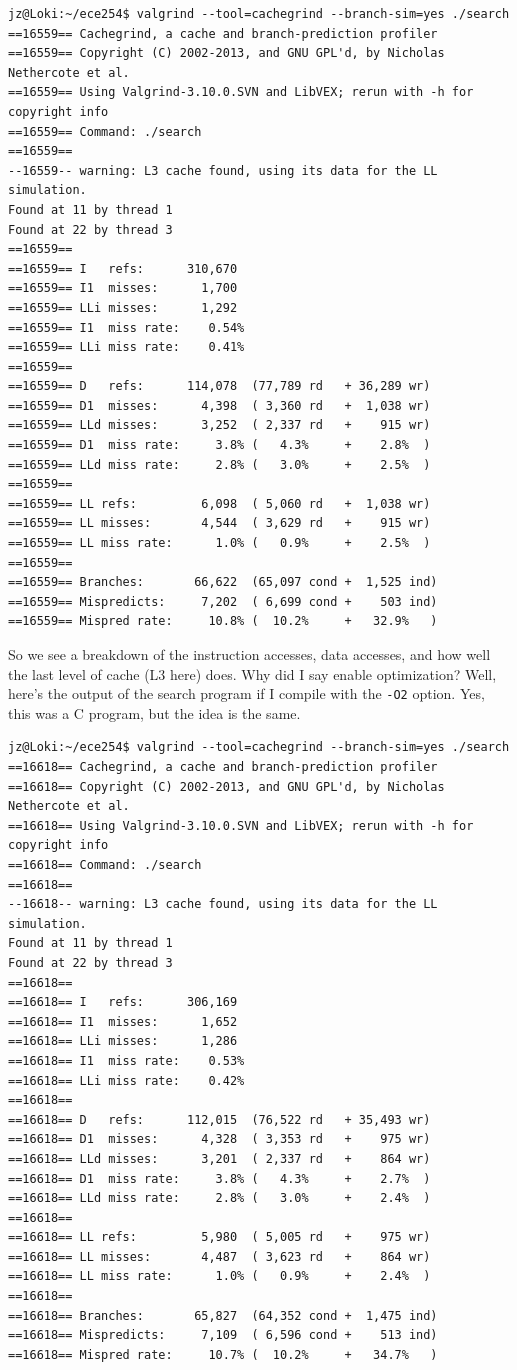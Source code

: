 \begin{lstlisting}
jz@Loki:~/ece254$ valgrind --tool=cachegrind --branch-sim=yes ./search
==16559== Cachegrind, a cache and branch-prediction profiler
==16559== Copyright (C) 2002-2013, and GNU GPL'd, by Nicholas Nethercote et al.
==16559== Using Valgrind-3.10.0.SVN and LibVEX; rerun with -h for copyright info
==16559== Command: ./search
==16559== 
--16559-- warning: L3 cache found, using its data for the LL simulation.
Found at 11 by thread 1 
Found at 22 by thread 3 
==16559== 
==16559== I   refs:      310,670
==16559== I1  misses:      1,700
==16559== LLi misses:      1,292
==16559== I1  miss rate:    0.54%
==16559== LLi miss rate:    0.41%
==16559== 
==16559== D   refs:      114,078  (77,789 rd   + 36,289 wr)
==16559== D1  misses:      4,398  ( 3,360 rd   +  1,038 wr)
==16559== LLd misses:      3,252  ( 2,337 rd   +    915 wr)
==16559== D1  miss rate:     3.8% (   4.3%     +    2.8%  )
==16559== LLd miss rate:     2.8% (   3.0%     +    2.5%  )
==16559== 
==16559== LL refs:         6,098  ( 5,060 rd   +  1,038 wr)
==16559== LL misses:       4,544  ( 3,629 rd   +    915 wr)
==16559== LL miss rate:      1.0% (   0.9%     +    2.5%  )
==16559== 
==16559== Branches:       66,622  (65,097 cond +  1,525 ind)
==16559== Mispredicts:     7,202  ( 6,699 cond +    503 ind)
==16559== Mispred rate:     10.8% (  10.2%     +   32.9%   )
\end{lstlisting}

So we see a breakdown of the instruction accesses, data accesses, and how well the last level of cache (L3 here) does. Why did I say enable optimization? Well, here's the output of the search program if I compile with the \texttt{-O2} option. Yes, this was a C program, but the idea is the same.

\begin{lstlisting}
jz@Loki:~/ece254$ valgrind --tool=cachegrind --branch-sim=yes ./search
==16618== Cachegrind, a cache and branch-prediction profiler
==16618== Copyright (C) 2002-2013, and GNU GPL'd, by Nicholas Nethercote et al.
==16618== Using Valgrind-3.10.0.SVN and LibVEX; rerun with -h for copyright info
==16618== Command: ./search
==16618== 
--16618-- warning: L3 cache found, using its data for the LL simulation.
Found at 11 by thread 1 
Found at 22 by thread 3 
==16618== 
==16618== I   refs:      306,169
==16618== I1  misses:      1,652
==16618== LLi misses:      1,286
==16618== I1  miss rate:    0.53%
==16618== LLi miss rate:    0.42%
==16618== 
==16618== D   refs:      112,015  (76,522 rd   + 35,493 wr)
==16618== D1  misses:      4,328  ( 3,353 rd   +    975 wr)
==16618== LLd misses:      3,201  ( 2,337 rd   +    864 wr)
==16618== D1  miss rate:     3.8% (   4.3%     +    2.7%  )
==16618== LLd miss rate:     2.8% (   3.0%     +    2.4%  )
==16618== 
==16618== LL refs:         5,980  ( 5,005 rd   +    975 wr)
==16618== LL misses:       4,487  ( 3,623 rd   +    864 wr)
==16618== LL miss rate:      1.0% (   0.9%     +    2.4%  )
==16618== 
==16618== Branches:       65,827  (64,352 cond +  1,475 ind)
==16618== Mispredicts:     7,109  ( 6,596 cond +    513 ind)
==16618== Mispred rate:     10.7% (  10.2%     +   34.7%   )
\end{lstlisting}


